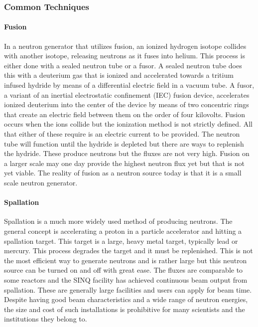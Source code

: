 \subsubsection{Common Techniques}

\paragraph{Fusion}

In a neutron generator that utilizes fusion, an ionized hydrogen isotope collides with another isotope, releasing neutrons as it fuses into helium. This process is either done with a sealed neutron tube or a fusor. A sealed neutron tube does this with a deuterium gas that is ionized and accelerated towards a tritium infused hydride by means of a differential electric field in a vacuum tube. A fusor, a variant of an inertial electrostatic confinement (IEC) fusion device, accelerates ionized deuterium into the center of the device by means of two concentric rings that create an electric field between them on the order of four kilovolts. Fusion occurs when the ions collide but the ionization method is not strictly defined. All that either of these require is an electric current to be provided. The neutron tube will function until the hydride is depleted but there are ways to replenish the hydride. These produce neutrons but the fluxes are not very high. Fusion on a larger scale may one day provide the highest neutron flux yet but that is not yet viable. The reality of fusion as a neutron source today is that it is a small scale neutron generator.

\paragraph{Spallation}

Spallation is a much more widely used method of producing neutrons. The general concept is accelerating a proton in a particle accelerator and hitting a spallation target. This target is a large, heavy metal target, typically lead or mercury. This process degrades the target and it must be replenished. This is not the most efficient way to generate neutrons and is rather large but this neutron source can be turned on and off with great ease. The fluxes are comparable to some reactors and the SINQ facility has achieved continuous beam output from spallation. These are generally large facilities and users can apply for beam time. Despite having good beam characteristics and a wide range of neutron energies, the size and cost of such installations is prohibitive for many scientists and the institutions they belong to.

